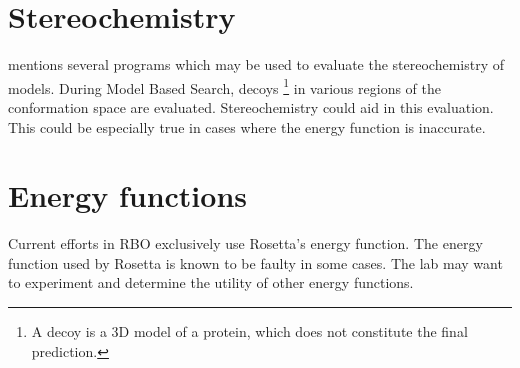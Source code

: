 \documentclass[10pt]{report}
\begin{document}
\section{Stereochemistry}

\cite{marti-renom2000com} mentions several programs which may be used to evaluate the stereochemistry of models. During Model Based Search, decoys \footnote{A decoy is a 3D model of a protein, which does not constitute the final prediction.} in various regions of the conformation space are evaluated. Stereochemistry could aid in this evaluation. This could be especially true in cases where the energy function is inaccurate.

\section{Energy functions}

Current efforts in RBO exclusively use Rosetta's energy function. The energy function used by Rosetta is known to be faulty in some cases. The lab may want to experiment and determine the utility of other energy functions.



\end{document}
